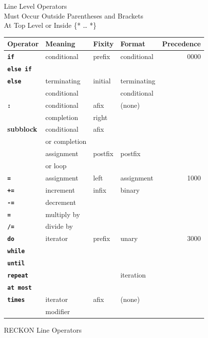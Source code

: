 \documentclass[12pt]{article}
\newcommand{\key}[1]{{\rm \bfseries #1}}
\newcommand{\ttkey}[1]{{\tt \bfseries #1}}
\newlength{\figurewidth}
\newenvironment{boxedfigure}[1][!btp]%
	{\begin{figure*}[#1]
	 \begin{lrbox}{\figurebox}
	 \begin{minipage}{\figurewidth}

	 \vspace*{1ex}}%
	{
	 \vspace*{1ex}

	 \end{minipage}
	 \end{lrbox}
	 \begin{center}
	 \fbox{\hspace*{0.1in}\usebox{\figurebox}\hspace*{0.1in}}
	 \end{center}
	 \end{figure*}}
\begin{document}
\begin{boxedfigure}[!p]
\begin{center}
Line Level Operators \\
Must Occur Outside Parentheses and Brackets \\
At Top Level or Inside \{* \ldots{} *\}
\\[1ex]
\begin{tabular}{|l|l|l|l|r|}
\hline
Operator & Meaning & Fixity & Format & Precedence \\
\hline
\ttkey{if} & conditional & prefix & conditional & 0000
\\\cline{1-1}
\ttkey{else if} & & & &
\\\cline{1-4}
\ttkey{else} & terminating & initial & terminating & \\
             & conditional & & conditional &
\\\cline{1-4}
\ttkey{:} & conditional & afix & (none) & \\
                   & completion & right & &
\\\cline{1-3}
\key{subblock} & conditional & afix & & \\
               & or completion &      & &
\\\cline{2-4}
	       & assignment & postfix & postfix & \\
	       & or loop    &         &         &
\\\hline
\ttkey{=} & assignment & left & assignment & 1000
\\\cline{1-4}
\ttkey{+=} & increment & infix & binary &
\\\cline{1-2}
\ttkey{-=} & decrement & & &
\\\cline{1-2}
\ttkey{*=} & multiply by & & &
\\\cline{1-2}
\ttkey{/=} & divide by & & &
\\\hline
\ttkey{do} & iterator & prefix & unary & 3000
\\\cline{1-1}
\ttkey{while} &       &        &       &
\\\cline{1-1}
\ttkey{until} &       &        &       &
\\\cline{1-1}\cline{4-4}
\ttkey{repeat} &       &        & iteration       &
\\\cline{1-1}
\ttkey{at most} &       &        &       &
\\\cline{1-4}
\ttkey{times} & iterator & afix   & (none) & \\
               & modifier &        &       &
\\\hline
\end{tabular}
\end{center}

\caption{RECKON Line Operators}
\label{RECKON-LINE-OPERATORS}
\end{boxedfigure}
\end{document}
